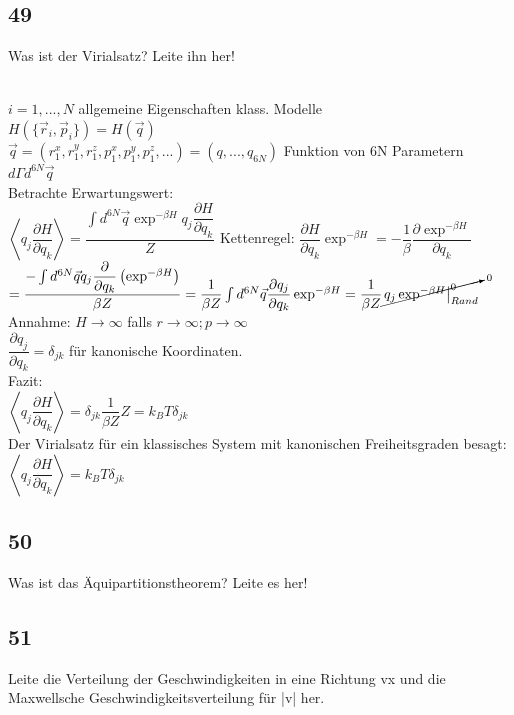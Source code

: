 \documentclass[12pt,a4paper]{report}
\newenvironment{myfrag}{\begin{it}}{\end{it}\vspace{3mm}\par}
\numberwithin{equation}{section}
\begin{document}
\subsection{49}
\begin{myfrag}
Was ist der Virialsatz? Leite ihn her!
\end{myfrag} \quad \\
$i= 1,...,N $ \qquad allgemeine Eigenschaften klass. Modelle \\[1.5ex]
$H(\{\vec{r}_i,\vec{p}_i\})=H(\vec{q})$\\[1ex]
$\vec{q}=(r_1^x,r_1^y,r_1^z, p_1^x,p_1^y,p_1^z,...)=(q,...,q_{6N})$ Funktion von 6N Parametern $d\Gamma d^{6N}\vec{q}$ \\[1.5ex]
Betrachte Erwartungswert: \\[1.5ex]
$\left\langle q_j \dfrac{\partial H}{\partial q_k} \right\rangle = \dfrac{\int d^{6N} \vec{q} \exp ^{-\beta H} q_j \dfrac{\partial H}{\partial q_k}}{Z}$ \qquad Kettenregel: $\dfrac{\partial H}{\partial q_k} \exp ^{-\beta H} = -\dfrac{1}{\beta } \dfrac{\partial \exp ^{ -\beta H}}{\partial q_k}$ \\[1ex]
$= \dfrac{-\int d^{6N} \vec{q} q_j \dfrac{\partial}{\partial q_k}\left( \exp ^{-\beta H} \right)}{\beta Z} = \dfrac{1}{\beta Z} \int d^{6N} \vec{q} \dfrac{\partial q_j}{\partial q_k} \exp ^{-\beta H} = \dfrac{1}{\beta Z} \cancelto{0}{\left. q_j \exp^{-\beta H}\right| _{Rand} ^0} $ \\[1.5ex]
Annahme: $ H \rightarrow \infty $ falls $r\rightarrow \infty; p\rightarrow \infty$ \\[1ex]
$\dfrac{\partial q_j}{\partial q_k} = \delta_{jk}$ für kanonische Koordinaten. \\[1.5ex]
Fazit: \\[1.5ex]
$\left\langle q_j \dfrac{\partial H}{\partial q_k}\right\rangle = \delta_{jk} \dfrac{1}{\beta Z}Z = k_BT\delta_{jk}$ \\[1.5ex]
Der Virialsatz für ein klassisches System mit kanonischen Freiheitsgraden besagt:
\\[1.5ex]
$\left\langle q_j \dfrac{\partial H}{\partial q_k}\right\rangle = k_BT\delta_{jk}$
\subsection{50}
\begin{myfrag}
Was ist das Äquipartitionstheorem? Leite es her!
\end{myfrag}
\subsection{51}
\begin{myfrag}
Leite die Verteilung der Geschwindigkeiten in eine Richtung vx und die
Maxwellsche Geschwindigkeitsverteilung für |v| her.
\end{myfrag}
\end{document}
